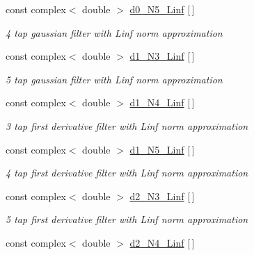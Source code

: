 \begin{DoxyCompactItemize}
\mbox{\label{IIRGausDeriv_8h_a430436bf7328ee9f31e8629e69939c45}} 
const complex$<$ double $>$ \hyperlink{IIRGausDeriv_8h_a430436bf7328ee9f31e8629e69939c45}{d0\+\_\+\+N5\+\_\+\+Linf} \mbox{[}$\,$\mbox{]}
\begin{DoxyCompactList}\small\item\em 4 tap gaussian filter with Linf norm approximation \end{DoxyCompactList}\item 
\mbox{\label{IIRGausDeriv_8h_ab3d3fead67d13ff1f71ec1671a7f0a75}} 
const complex$<$ double $>$ \hyperlink{IIRGausDeriv_8h_ab3d3fead67d13ff1f71ec1671a7f0a75}{d1\+\_\+\+N3\+\_\+\+Linf} \mbox{[}$\,$\mbox{]}
\begin{DoxyCompactList}\small\item\em 5 tap gaussian filter with Linf norm approximation \end{DoxyCompactList}\item 
\mbox{\label{IIRGausDeriv_8h_a42c5979a0cc3ff593c910114a7a04b54}} 
const complex$<$ double $>$ \hyperlink{IIRGausDeriv_8h_a42c5979a0cc3ff593c910114a7a04b54}{d1\+\_\+\+N4\+\_\+\+Linf} \mbox{[}$\,$\mbox{]}
\begin{DoxyCompactList}\small\item\em 3 tap first derivative filter with Linf norm approximation \end{DoxyCompactList}\item 
\mbox{\label{IIRGausDeriv_8h_a941413cacffcd396c95b80945cf2ef7b}} 
const complex$<$ double $>$ \hyperlink{IIRGausDeriv_8h_a941413cacffcd396c95b80945cf2ef7b}{d1\+\_\+\+N5\+\_\+\+Linf} \mbox{[}$\,$\mbox{]}
\begin{DoxyCompactList}\small\item\em 4 tap first derivative filter with Linf norm approximation \end{DoxyCompactList}\item 
\mbox{\label{IIRGausDeriv_8h_a4d0b8b8666422f4f29a55924643844b2}} 
const complex$<$ double $>$ \hyperlink{IIRGausDeriv_8h_a4d0b8b8666422f4f29a55924643844b2}{d2\+\_\+\+N3\+\_\+\+Linf} \mbox{[}$\,$\mbox{]}
\begin{DoxyCompactList}\small\item\em 5 tap first derivative filter with Linf norm approximation \end{DoxyCompactList}\item 
\mbox{\label{IIRGausDeriv_8h_aa44e4e7714c800b8ba69135d67e969c1}} 
const complex$<$ double $>$ \hyperlink{IIRGausDeriv_8h_aa44e4e7714c800b8ba69135d67e969c1}{d2\+\_\+\+N4\+\_\+\+Linf} \mbox{[}$\,$\mbox{]}

\end{DoxyCompactItemize}
